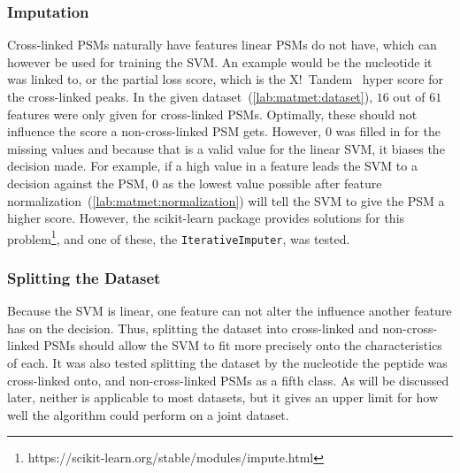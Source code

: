 \subsubsection{Imputation}
\label{lab:matmet:imputation}
Cross-linked PSMs naturally have features linear PSMs do not have, which can however be used for training the SVM. An example would be the nucleotide it was linked to, or the partial loss score, which is the X!~Tandem~\cite{Craig2004} hyper score for the cross-linked peaks. In the given dataset~(\ref{lab:matmet:dataset}), $16$ out of $61$ features were only given for cross-linked PSMs. Optimally, these should not influence the score a non-cross-linked PSM gets. However, $0$ was filled in for the missing values and because that is a valid value for the linear SVM, it biases the decision made. For example, if a high value in a feature leads the SVM to a decision against the PSM, $0$ as the lowest value possible after feature normalization~(\ref{lab:matmet:normalization}) will tell the SVM to give the PSM a higher score. However, the scikit-learn package provides solutions for this problem\footnote{https://scikit-learn.org/stable/modules/impute.html}, and one of these, the \texttt{IterativeImputer}, was tested. %
\subsubsection{Splitting the Dataset}
\label{lab:matmet:splitting}
Because the SVM is linear, one feature can not alter the influence another feature has on the decision. Thus, splitting the dataset into cross-linked and non-cross-linked PSMs should allow the SVM to fit more precisely onto the characteristics of each. It was also tested splitting the dataset by the nucleotide the peptide was cross-linked onto, and non-cross-linked PSMs as a fifth class. As will be discussed later, neither is applicable to most datasets, but it gives an upper limit for how well the algorithm could perform on a joint dataset. 

